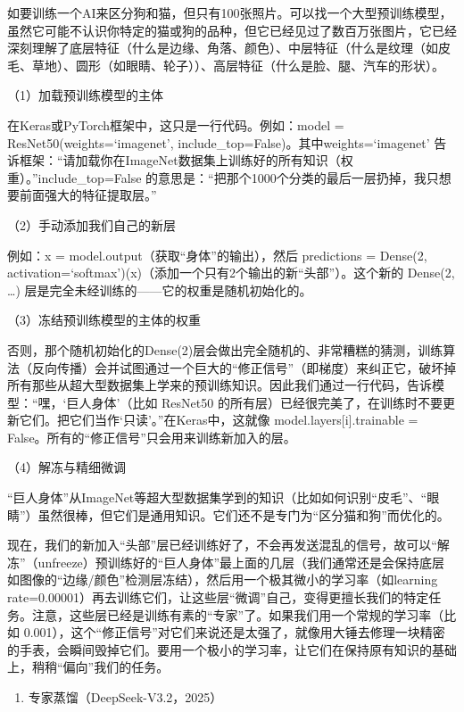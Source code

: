 如要训练一个AI来区分狗和猫，但只有100张照片。可以找一个大型预训练模型，虽然它可能不认识你特定的猫或狗的品种，但它已经见过了数百万张图片，它已经深刻理解了底层特征（什么是边缘、角落、颜色）、中层特征（什么是纹理（如皮毛、草地）、圆形（如眼睛、轮子））、高层特征（什么是脸、腿、汽车的形状）。

（1）加载预训练模型的主体

在Keras或PyTorch框架中，这只是一行代码。例如：model = ResNet50(weights=`imagenet', include\_top=False)。其中weights=`imagenet' 告诉框架：``请加载你在ImageNet数据集上训练好的所有知识（权重）。''include\_top=False 的意思是：``把那个1000个分类的最后一层扔掉，我只想要前面强大的特征提取层。''

（2）手动添加我们自己的新层

例如：x = model.output（获取``身体''的输出），然后 predictions = Dense(2, activation=`softmax')(x)（添加一个只有2个输出的新``头部''）。这个新的 Dense(2, \ldots) 层是完全未经训练的------它的权重是随机初始化的。

（3）冻结预训练模型的主体的权重

否则，那个随机初始化的Dense(2)层会做出完全随机的、非常糟糕的猜测，训练算法（反向传播）会并试图通过一个巨大的``修正信号''（即梯度）来纠正它，破坏掉所有那些从超大型数据集上学来的预训练知识。因此我们通过一行代码，告诉模型：``嘿，`巨人身体'（比如 ResNet50 的所有层）已经很完美了，在训练时不要更新它们。把它们当作`只读'。''在Keras中，这就像 model.layers{[}i{]}.trainable = False。所有的``修正信号''只会用来训练新加入的层。

（4）解冻与精细微调

``巨人身体''从ImageNet等超大型数据集学到的知识（比如如何识别``皮毛''、``眼睛''）虽然很棒，但它们是通用知识。它们还不是专门为``区分猫和狗''而优化的。

现在，我们的新加入``头部''层已经训练好了，不会再发送混乱的信号，故可以``解冻''（unfreeze）预训练好的``巨人身体''最上面的几层（我们通常还是会保持底层如图像的``边缘/颜色''检测层冻结），然后用一个极其微小的学习率（如learning rate=0.00001）再去训练它们，让这些层``微调''自己，变得更擅长我们的特定任务。注意，这些层已经是训练有素的``专家''了。如果我们用一个常规的学习率（比如 0.001），这个``修正信号''对它们来说还是太强了，就像用大锤去修理一块精密的手表，会瞬间毁掉它们。要用一个极小的学习率，让它们在保持原有知识的基础上，稍稍``偏向''我们的任务。

\begin{enumerate}
\def\labelenumi{\arabic{enumi}.}
\setcounter{enumi}{2}
\tightlist
\item
  专家蒸馏（DeepSeek-V3.2，2025）
\end{enumerate}

